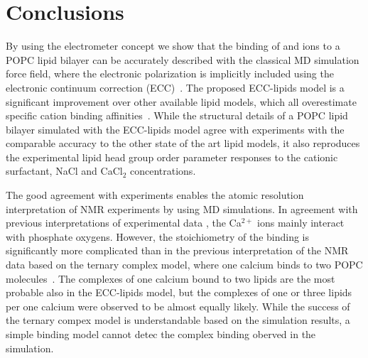 \documentclass[aip,jcp,twocolumn]{revtex4}
\begin{document}






\section{Conclusions}

By using the electrometer concept we show that the binding of  and  ions
to a POPC lipid bilayer can be accurately described with the classical MD simulation 
force field, where the electronic polarization is implicitly included using 
the electronic continuum correction (ECC)~\cite{leontyev11}.
The proposed ECC-lipids model is a significant improvement over 
other available lipid models, which all overestimate specific cation binding affinities~\cite{catte16}.  
While the structural details of a POPC lipid bilayer simulated with the ECC-lipids
model agree with experiments with the comparable accuracy to the other state of the art lipid models,
it also reproduces the experimental lipid head group order parameter responses to
the cationic surfactant, NaCl and CaCl$_2$ concentrations. 

The good agreement with experiments enables the atomic resolution 
interpretation of NMR experiments by using MD simulations.
In agreement with previous interpretations of experimental data \cite{hauser76,hauser78,herbette84,binder02},
the Ca$^{2+}$ ions mainly interact with phosphate oxygens.
However, the stoichiometry of the binding is significantly more complicated 
than in the previous interpretation of the NMR data based on 
the ternary complex model, where one calcium binds to two POPC molecules~\cite{altenbach84}.
The complexes of one calcium bound to two lipids are the most probable also in the
ECC-lipids model, but the complexes of one or three lipids per one calcium
were observed to be almost equally likely. While the success of the ternary
compex model is understandable based on the simulation results,
a simple binding model cannot detec the complex binding
oberved in the simulation.
\end{document}
